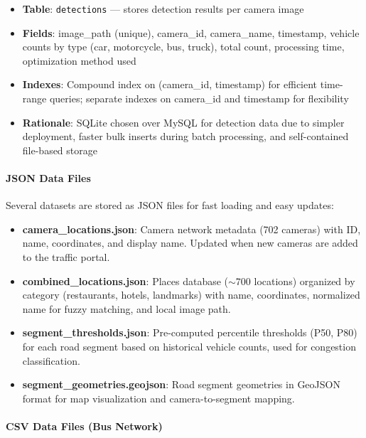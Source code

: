 \begin{itemize}[noitemsep]
    \item \textbf{Table}: \texttt{detections} --- stores detection results per camera image
    \item \textbf{Fields}: image\_path (unique), camera\_id, camera\_name, timestamp, vehicle counts by type (car, motorcycle, bus, truck), total count, processing time, optimization method used
    \item \textbf{Indexes}: Compound index on (camera\_id, timestamp) for efficient time-range queries; separate indexes on camera\_id and timestamp for flexibility
    \item \textbf{Rationale}: SQLite chosen over MySQL for detection data due to simpler deployment, faster bulk inserts during batch processing, and self-contained file-based storage
\end{itemize}

\paragraph{JSON Data Files}

Several datasets are stored as JSON files for fast loading and easy updates:

\begin{itemize}[noitemsep]
    \item \textbf{camera\_locations.json}: Camera network metadata (702 cameras) with ID, name, coordinates, and display name. Updated when new cameras are added to the traffic portal.
    
    \item \textbf{combined\_locations.json}: Places database ($\sim$700 locations) organized by category (restaurants, hotels, landmarks) with name, coordinates, normalized name for fuzzy matching, and local image path.
    
    \item \textbf{segment\_thresholds.json}: Pre-computed percentile thresholds (P50, P80) for each road segment based on historical vehicle counts, used for congestion classification.
    
    \item \textbf{segment\_geometries.geojson}: Road segment geometries in GeoJSON format for map visualization and camera-to-segment mapping.
\end{itemize}

\paragraph{CSV Data Files (Bus Network)}


